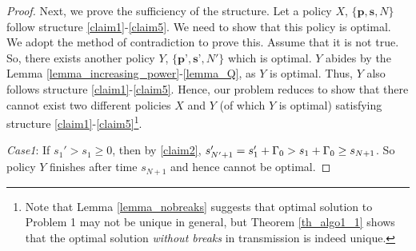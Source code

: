 \begin{proof}

Next, we prove the sufficiency of the structure. Let a policy $X$, $\{\textbf{p},\textbf{s},N\}$ follow  structure \eqref{claim1}-\eqref{claim5}. We need to show that this policy is optimal. We adopt the method of contradiction to prove this. Assume that it is not true. So, there exists another policy $Y$, $\{\textbf{p'},\textbf{s'},N'\}$ which is optimal. $Y$ abides by the Lemma \ref{lemma_increasing_power}-\ref{lemma_Q}, as $Y$ is optimal. Thus, $Y$ also follows structure \eqref{claim1}-\eqref{claim5}. Hence, our problem reduces to show that there cannot exist two different policies $X$ and $Y$ (of which $Y$ is optimal) satisfying structure \eqref{claim1}-\eqref{claim5}\footnote{Note that Lemma \ref{lemma_nobreaks} suggests that optimal solution to Problem 1 may not be unique in general, but Theorem \ref{th_algo1_1} shows that the optimal solution \textit{without breaks} in transmission is indeed unique.}.


\textit{Case1}: If $s_1'>s_1\ge 0$, then by \eqref{claim2}, $s_{N'+1}'=s_1'+\Gamma_0>s_1+\Gamma_0\ge s_{N+1}$. So policy $Y$ finishes after time $s_{N+1}$ and hence cannot be optimal. 


\end{proof}
